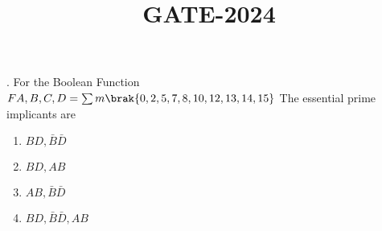 \documentclass{article}
\title{GATE-2024}
\date{}
\begin{document}
. For the Boolean Function $ F{A,B,C,D} = \sum m\brak{0,2,5,7,8,10,12,13,14,15}$
The essential prime implicants are \linespread{}             
\begin{enumerate}[label=(\Alph*)]
\item $BD,\bar{B}\bar{D}$
\item $BD,AB$
\item $AB,\bar{B}\bar{D}$
\item $BD,\bar{B}\bar{D},AB$
\end{enumerate}
\end{document}
